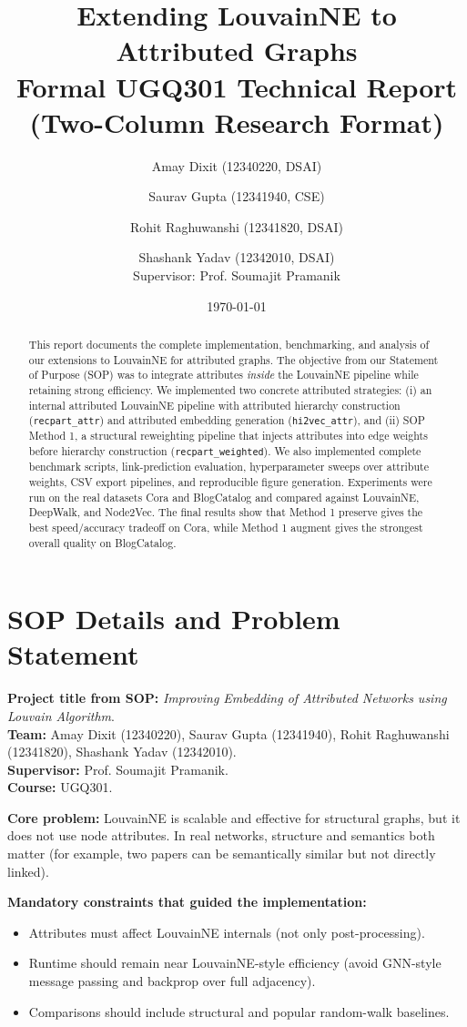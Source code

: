 \documentclass[10pt,twoside,twocolumn]{article}
\title{\textbf{Extending LouvainNE to Attributed Graphs}\\
\normalsize Formal UGQ301 Technical Report (Two-Column Research Format)}
\author{%
Amay Dixit (12340220, DSAI) \and
Saurav Gupta (12341940, CSE) \and
Rohit Raghuwanshi (12341820, DSAI) \and
Shashank Yadav (12342010, DSAI)\\[0.35em]
Supervisor: Prof. Soumajit Pramanik
}
\date{\today}
\begin{document}
\maketitle

\begin{abstract}
This report documents the complete implementation, benchmarking, and analysis of our extensions to LouvainNE for attributed graphs. The objective from our Statement of Purpose (SOP) was to integrate attributes \emph{inside} the LouvainNE pipeline while retaining strong efficiency. We implemented two concrete attributed strategies: (i) an internal attributed LouvainNE pipeline with attributed hierarchy construction (\texttt{recpart\_attr}) and attributed embedding generation (\texttt{hi2vec\_attr}), and (ii) SOP Method 1, a structural reweighting pipeline that injects attributes into edge weights before hierarchy construction (\texttt{recpart\_weighted}). We also implemented complete benchmark scripts, link-prediction evaluation, hyperparameter sweeps over attribute weights, CSV export pipelines, and reproducible figure generation. Experiments were run on the real datasets Cora and BlogCatalog and compared against LouvainNE, DeepWalk, and Node2Vec. The final results show that Method 1 preserve gives the best speed/accuracy tradeoff on Cora, while Method 1 augment gives the strongest overall quality on BlogCatalog.
\end{abstract}

\section{SOP Details and Problem Statement}
\textbf{Project title from SOP:} \emph{Improving Embedding of Attributed Networks using Louvain Algorithm}.\\
\textbf{Team:} Amay Dixit (12340220), Saurav Gupta (12341940), Rohit Raghuwanshi (12341820), Shashank Yadav (12342010).\\
\textbf{Supervisor:} Prof. Soumajit Pramanik.\\
\textbf{Course:} UGQ301.

\textbf{Core problem:} LouvainNE is scalable and effective for structural graphs, but it does not use node attributes. In real networks, structure and semantics both matter (for example, two papers can be semantically similar but not directly linked).

\textbf{Mandatory constraints that guided the implementation:}
\begin{itemize}
  \item Attributes must affect LouvainNE internals (not only post-processing).
  \item Runtime should remain near LouvainNE-style efficiency (avoid GNN-style message passing and backprop over full adjacency).
  \item Comparisons should include structural and popular random-walk baselines.
\end{itemize}
\end{document}

